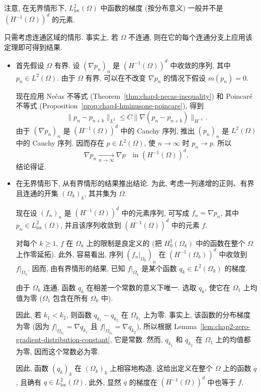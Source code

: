 注意, 在无界情形下, $L_{\mathrm{loc}}^2(\Omega)$ 中函数的梯度 (按分布意义) 一般并不是 $(H^{-1}(\Omega))^d$ 的元素.

\begin{Proof}
只需考虑连通区域的情形. 事实上, 若 $\Omega$ 不连通, 则在它的每个连通分支上应用该定理即可得到结果.

\begin{itemize}
 \item 首先假设 $\Omega$ 有界. 设 $(\nabla p_n)_n$ 是 $(H^{-1}(\Omega))^d$ 中收敛的序列, 其中 $p_n\in L^2(\Omega)$. 由于 $\Omega$ 有界, 可以在不改变 $\nabla p_n$ 的情况下假设 $m(p_n)=0$.

 现在应用 Nečas 不等式 (Theorem~\ref{thm:chap4-necas-inequality}) 和 Poincaré 不等式 (Proposition~\ref{prop:chap4-hminusone-poincare}), 得到
 \[
  \|p_n-p_{n+k}\|_{L^2}
  \leq C\|\nabla(p_n-p_{n+k})\|_{H^{-1}}.
 \]
 由于 $(\nabla p_n)_n$ 是 $(H^{-1}(\Omega))^d$ 中的 Cauchy 序列, 推出 $(p_n)_n$ 是 $L^2(\Omega)$ 中的 Cauchy 序列. 因而存在 $p\in L^2(\Omega)$, 使 $n\to\infty$ 时 $p_n\to p$. 所以
 \[
  \nabla p_n\xrightarrow[n\to\infty]{}\nabla p
  \quad\text{in }(H^{-1}(\Omega))^d,
 \]
 结论得证.

 \item 在无界情形下, 从有界情形的结果推出结论. 为此, 考虑一列递增的正则、有界且连通的开集 $(\Omega_k)_k$, 其并集为 $\Omega$.

 现在设 $(f_n)_n$ 是 $(H^{-1}(\Omega))^d$ 中的元素序列, 可写成 $f_n=\nabla p_n$, 其中 $p_n\in L_{\mathrm{loc}}^2(\Omega)$, 并且该序列收敛到 $(H^{-1}(\Omega))^d$ 中的元素 $f$.

 对每个 $k\geq1$, $f$ 在 $\Omega_k$ 上的限制是良定义的 (把 $H_0^1(\Omega_k)$ 中的函数在整个 $\Omega$ 上作零延拓). 此外, 容易看出, 序列 $(f_n|_{\Omega_k})_n$ 在 $(H^{-1}(\Omega_k))^d$ 中收敛到 $f|_{\Omega_k}$. 因而, 由有界情形的结果, 已知 $f|_{\Omega_k}$ 是某个函数 $q_k\in L^2(\Omega_k)$ 的梯度.

 由于 $\Omega_k$ 连通, 函数 $q_k$ 在相差一个常数的意义下唯一. 选取 $q_k$, 使它在 $\Omega_1$ 上均值为零 ($\Omega_1$ 包含在所有 $\Omega_k$ 中).

 因此, 若 $k_1<k_2$, 则函数 $q_{k_1}-q_{k_2}$ 在 $\Omega_{k_1}$ 上为零. 事实上, 该函数的分布梯度为零 (因为 $f|_{\Omega_{k_1}}=\nabla q_{k_1}$ 且 $f|_{\Omega_{k_2}}=\nabla q_{k_2}$), 所以根据 Lemma~\ref{lem:chap2-zero-gradient-distribution-constant}, 它是常数. 然而, $q_{k_1}$ 和 $q_{k_2}$ 在 $\Omega_1$ 上的均值都为零, 因而这个常数必为零.

 因此, 函数 $(q_k)_k$ 在 $(\Omega_k)_k$ 上相容地构造, 这给出定义在整个 $\Omega$ 上的函数 $q$, 且确有 $q\in L_{\mathrm{loc}}^2(\Omega)$. 此外, 显然 $q$ 的梯度在 $(H^{-1}(\Omega))^d$ 中也等于 $f$.
\end{itemize}
\end{Proof}

